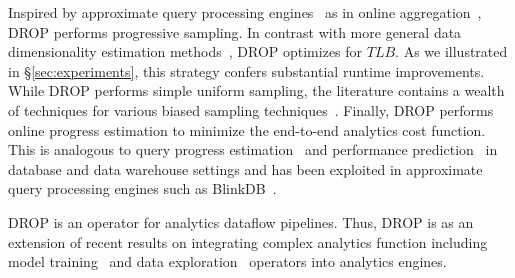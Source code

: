 Inspired by approximate query processing engines~\cite{barzan-keynote}
as in online aggregation~\cite{onlineagg}, DROP performs progressive
sampling.  In contrast
with more general data dimensionality estimation
methods~\cite{dr-estimation}, DROP optimizes for
$TLB$. As we illustrated in \S\ref{sec:experiments}, this
strategy confers substantial runtime improvements.
While DROP performs simple uniform sampling, the literature contains a wealth of techniques for various biased sampling techniques~\cite{surajit-sample, surajit-2}.
Finally, DROP performs online progress estimation to minimize the
end-to-end analytics cost function. This is analogous to query
progress estimation~\cite{qpi1} and performance
prediction~\cite{mr-predict} in database and data
warehouse settings and has been exploited in approximate query
processing engines such as BlinkDB~\cite{blinkdb}. 

 DROP is an operator
for analytics dataflow pipelines. Thus, DROP is
as an extension of recent results on integrating complex
analytics function including model training~\cite{bismarck,mcdb,mlbase} and
data exploration~\cite{scorpion,canopy,kraska-viz} operators into analytics engines. 
